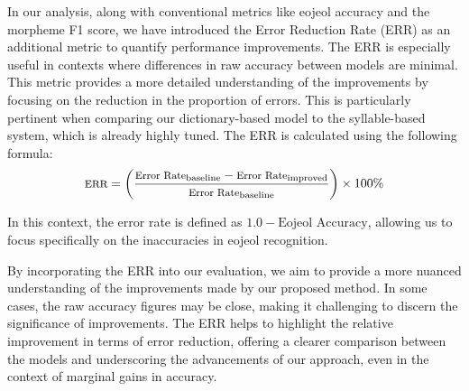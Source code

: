 \documentclass[AMS,STIX2COL]{WileyNJD-v2}
\begin{document}
    In our analysis, along with conventional metrics like eojeol accuracy and the morpheme F1 score, we have introduced the Error Reduction Rate (ERR) as an additional metric to quantify performance improvements.
    The ERR is especially useful in contexts where differences in raw accuracy between models are minimal.
    This metric provides a more detailed understanding of the improvements by focusing on the reduction in the proportion of errors.
    This is particularly pertinent when comparing our dictionary-based model to the syllable-based system, which is already highly tuned.
    The ERR is calculated using the following formula:
    \vspace{1mm}
    \[
        \footnotesize
        \text{ERR} = \left( \frac{\text{Error Rate}_{\text{baseline}} - \text{Error Rate}_{\text{improved}}}{\text{Error Rate}_{\text{baseline}}} \right) \times 100\%
    \]
    \vspace{0.5mm}

    In this context, the error rate is defined as \(1.0 - \text{Eojeol Accuracy}\), allowing us to focus specifically on the inaccuracies in eojeol recognition.

    By incorporating the ERR into our evaluation, we aim to provide a more nuanced understanding of the improvements made by our proposed method.
    In some cases, the raw accuracy figures may be close, making it challenging to discern the significance of improvements.
    The ERR helps to highlight the relative improvement in terms of error reduction, offering a clearer comparison between the models and underscoring the advancements of our approach, even in the context of marginal gains in accuracy.
\end{document}
